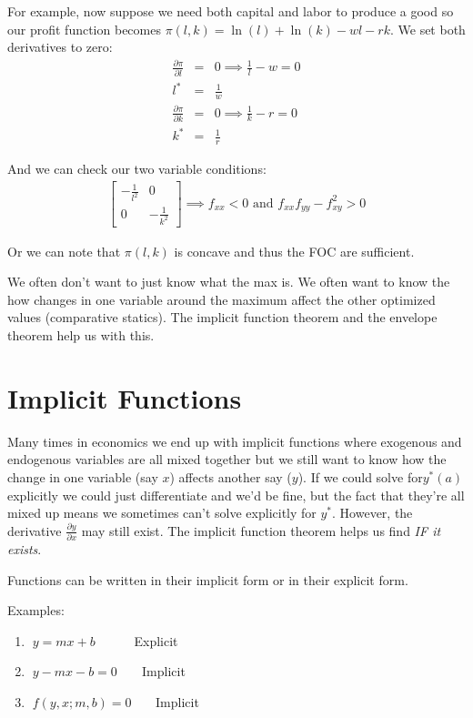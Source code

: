 \documentclass[11pt,english]{article}
\begin{document}
For example, now suppose we need both capital and labor to produce a good so our profit function becomes $\pi(l,k)=\ln(l)+\ln(k)-wl-rk$. We set both derivatives to zero:
\begin{eqnarray*}
\frac{\partial \pi}{\partial l}& = &0 \implies \frac{1}{l}-w=0 \\
l^*& = &\frac{1}{w} \\
\frac{\partial \pi}{\partial k}& = &0 \implies \frac{1}{k}-r=0 \\
k^*& = &\frac{1}{r}
\end{eqnarray*}

And we can check our two variable conditions:
\begin{eqnarray*}
\begin{bmatrix}
-\frac{1}{l^2} & 0 \\
0 & -\frac{1}{k^2}
\end{bmatrix} \implies f_{xx}<0 \mbox{ and } f_{xx}f_{yy}-f_{xy}^2>0
\end{eqnarray*}

Or we can note that $\pi(l,k)$ is concave and thus the FOC are sufficient.
\bigskip

We often don't want to just know what the max is. We often want to know the how changes in one variable around the maximum affect the other optimized values (comparative statics). The implicit function theorem and the envelope theorem help us with this.


\section{Implicit Functions}

Many times in economics we end up with implicit functions where exogenous
and endogenous variables are all mixed together but we still want to know how the change in one variable (say $x$) affects another say ($y$). If we could solve for$y^*(a)$ explicitly we could just differentiate and we'd be fine, but the fact that they're all mixed up means we sometimes can't solve explicitly for $y^*$. However, the derivative $\frac{\partial y}{\partial x}$ may still exist. The implicit function theorem helps us find \emph{IF it exists}.

\bigskip

Functions can be written in their implicit form or in their explicit form.

Examples:

\begin{enumerate}
\item $\;y=mx+b\;\;\;\;\;\;\;\;\;\;\;$Explicit

\item $\;y-mx-b=0\;\;\;\;\;\;\;$Implicit

\item $\;f(y,x;m,b)=0\;\;\;\;\;\;\ $Implicit
\end{enumerate}
\end{document}
